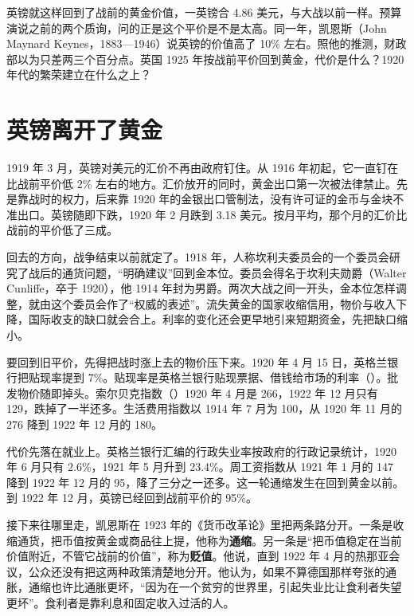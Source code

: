 英镑就这样回到了战前的黄金价值，一英镑合 4.86 美元，与大战以前一样\cite{brown1940}。预算演说之前的两个质询，问的正是这个平价是不是太高。同一年，凯恩斯（John Maynard Keynes，1883—1946）说英镑的价值高了 10\% 左右。照他的推测，财政部以为只差两三个百分点\cite{keynes1925}。英国 1925 年按战前平价回到黄金，代价是什么？1920 年代的繁荣建立在什么之上？

\section{英镑离开了黄金}\label{sec:interwar-world}

1919 年 3 月，英镑对美元的汇价不再由政府钉住\cite{brown1940}。从 1916 年初起，它一直钉在比战前平价低 2\% 左右的地方\cite{boe2017}。汇价放开的同时，黄金出口第一次被法律禁止\cite{brown1940}。先是靠战时的权力，后来靠 1920 年的金银出口管制法，没有许可证的金币与金块不准出口\cite{hansard1925}。英镑随即下跌，1920 年 2 月跌到 3.18 美元\cite{brown1940}。按月平均，那个月的汇价比战前的平价低了三成\cite{boe2017}。

回去的方向，战争结束以前就定了。1918 年，人称坎利夫委员会的一个委员会研究了战后的通货问题，“明确建议”回到金本位\cite{hansardlords1925}。委员会得名于坎利夫勋爵（Walter Cunliffe，卒于 1920），他 1914 年封为男爵\cite{hansardpeople27}。两次大战之间一开头，金本位怎样调整，就由这个委员会作了“权威的表述”\cite{nurkse1944}。流失黄金的国家收缩信用，物价与收入下降，国际收支的缺口就会合上。利率的变化还会更早地引来短期资金，先把缺口缩小\cite{nurkse1944}。

要回到旧平价，先得把战时涨上去的物价压下来。1920 年 4 月 15 日，英格兰银行把贴现率提到 7\%\cite{boe2017}。贴现率是英格兰银行贴现票据、借钱给市场的利率（）。批发物价随即掉头。索尔贝克指数（）1920 年 4 月是 266，1922 年 12 月只有 129，跌掉了一半还多\cite{boe2017}。生活费用指数以 1914 年 7 月为 100，从 1920 年 11 月的 276 降到 1922 年 12 月的 180\cite{boe2017}。

代价先落在就业上。英格兰银行汇编的行政失业率按政府的行政记录统计，1920 年 6 月只有 2.6\%，1921 年 5 月升到 23.4\%\cite{boe2017}。周工资指数从 1921 年 1 月的 147 降到 1922 年 12 月的 95，降了三分之一还多\cite{boe2017}。这一轮通缩发生在回到黄金以前。到 1922 年 12 月，英镑已经回到战前平价的 95\%\cite{boe2017}。

接下来往哪里走，凯恩斯在 1923 年的《货币改革论》里把两条路分开。一条是收缩通货，把币值按黄金或商品往上提，他称为\textbf{通缩}。另一条是“把币值稳定在当前价值附近，不管它战前的价值”，称为\textbf{贬值}\cite{keynes1923}。他说，直到 1922 年 4 月的热那亚会议，公众还没有把这两种政策清楚地分开\cite{keynes1923}。他认为，如果不算德国那样夸张的通胀，通缩也许比通胀更坏，“因为在一个贫穷的世界里，引起失业比让食利者失望更坏”\cite{keynes1923}。食利者是靠利息和固定收入过活的人。

